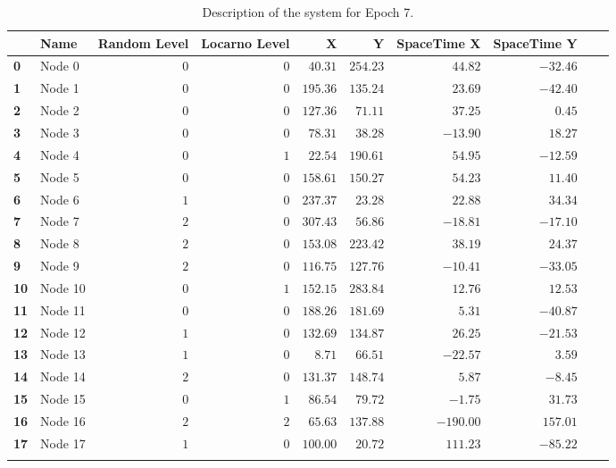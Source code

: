 \documentclass[a4paper,11pt,twoside=semi,openright]{report}
\begin{document}
\begin{table}[h]
\centering
\tiny
\begin{tabular}{@{}llrrrrrrll@{}}
\toprule
& \textbf{Name}   &\textbf{Random Level} &\textbf{Locarno Level} & \textbf{X} & \textbf{Y} & \textbf{SpaceTime X} & \textbf{SpaceTime Y}  \\ \midrule
\textbf{0} & Node 0&$0$&$0$&$40.31$&$254.23$&$44.82$&$-32.46$&\\ \hdashline
\textbf{1} & Node 1&$0$&$0$&$195.36$&$135.24$&$23.69$&$-42.40$&\\ \hdashline
\textbf{2} & Node 2&$0$&$0$&$127.36$&$71.11$&$37.25$&$0.45$&\\ \hdashline
\textbf{3} & Node 3&$0$&$0$&$78.31$&$38.28$&$-13.90$&$18.27$&\\ \hdashline
\textbf{4} & Node 4&$0$&$1$&$22.54$&$190.61$&$54.95$&$-12.59$&\\ \hdashline
\textbf{5} & Node 5&$0$&$0$&$158.61$&$150.27$&$54.23$&$11.40$&\\ \hdashline
\textbf{6} & Node 6&$1$&$0$&$237.37$&$23.28$&$22.88$&$34.34$&\\ \hdashline
\textbf{7} & Node 7&$2$&$0$&$307.43$&$56.86$&$-18.81$&$-17.10$&\\ \hdashline
\textbf{8} & Node 8&$2$&$0$&$153.08$&$223.42$&$38.19$&$24.37$&\\ \hdashline
\textbf{9} & Node 9&$2$&$0$&$116.75$&$127.76$&$-10.41$&$-33.05$&\\ \hdashline
\textbf{10} & Node 10&$0$&$1$&$152.15$&$283.84$&$12.76$&$12.53$&\\ \hdashline
\textbf{11} & Node 11&$0$&$0$&$188.26$&$181.69$&$5.31$&$-40.87$&\\ \hdashline
\textbf{12} & Node 12&$1$&$0$&$132.69$&$134.87$&$26.25$&$-21.53$&\\ \hdashline
\textbf{13} & Node 13&$1$&$0$&$8.71$&$66.51$&$-22.57$&$3.59$&\\ \hdashline
\textbf{14} & Node 14&$2$&$0$&$131.37$&$148.74$&$5.87$&$-8.45$&\\ \hdashline
\textbf{15} & Node 15&$0$&$1$&$86.54$&$79.72$&$-1.75$&$31.73$&\\ \hdashline
\textbf{16} & Node 16&$2$&$2$&$65.63$&$137.88$&$-190.00$&$157.01$&\\ \hdashline
\textbf{17} & Node 17&$1$&$0$&$100.00$&$20.72$&$111.23$&$-85.22$&\\ \hdashline\midrule
\bottomrule
\end{tabular}
\caption{Description of the system for Epoch 7.}
\end{table}
\end{document}
